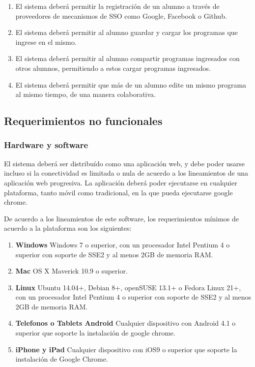\documentclass[a4paper,11pt]{article}
\begin{document}
\begin{enumerate}

  \item El sistema deberá permitir la registración de un alumno a través de
    proveedores de mecanismos de SSO como Google, Facebook o Github.

  \item El sistema deberá permitir al alumno guardar y cargar los programas
    que ingrese en el mismo.

  \item El sistema deberá permitir al alumno compartir programas ingresados
    con otros alumnos, permitiendo a estos cargar programas ingresados.

  \item El sistema deberá permitir que más de un alumno edite un mismo
    programa al mismo tiempo, de una manera colaborativa.

\end{enumerate}

\subsection{Requerimientos no funcionales}

\subsubsection{Hardware y software}

El sistema deberá ser distribuído como una aplicación web, y debe poder usarse
incluso si la conectividad es limitada o nula de acuerdo a los lineamientos de
una aplicación web progresiva. La aplicación deberá poder ejecutarse en
cualquier plataforma, tanto móvil como tradicional, en la que pueda ejecutarse
google chrome.

De acuerdo a los lineamientos de este software, los requerimientos mínimos de
acuerdo a la plataforma son los siguientes:

\begin{enumerate}

  \item \textbf{Windows} Windows 7 o superior, con un procesador Intel Pentium
    4 o superior con soporte de SSE2 y al menos 2GB de memoria RAM.

  \item \textbf{Mac} OS X Maverick 10.9 o superior.

  \item \textbf{Linux} Ubuntu 14.04+, Debian 8+, openSUSE 13.1+ o Fedora Linux
    21+, con un procesador Intel Pentium 4 o superior con soporte de SSE2 y al
    menos 2GB de memoria RAM.

  \item \textbf{Telefonos o Tablets Android} Cualquier dispositivo con Android
    4.1 o superior que soporte la instalación de google chrome.

  \item \textbf{iPhone y iPad} Cualquier dispositivo con iOS9 o superior que
    soporte la instalación de Google Chrome.

\end{enumerate}
\end{document}
